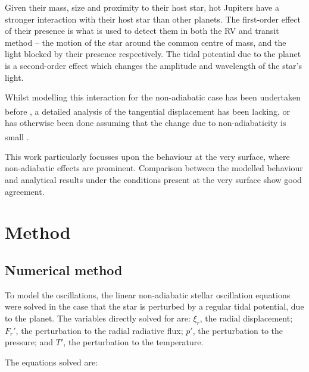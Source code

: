 \documentclass[a0,portrait]{a0poster}
\begin{document}
\begin{multicols}{2}
Given their mass, size and proximity to their host star, hot Jupiters have a stronger interaction with their host star than other planets. The first-order effect of their presence is what is used to detect them in both the RV and transit method -- the motion of the star around the common centre of mass, and the light blocked by their presence respectively. The tidal potential due to the planet is a second-order effect which changes the amplitude and wavelength of the star's light.

Whilst modelling this interaction for the non-adiabatic case has been undertaken before \textsuperscript{\cite{Pfahl2008}}, a detailed analysis of the tangential displacement has been lacking, or has otherwise been done assuming that the change due to non-adiabaticity is small \textsuperscript{\cite{Terquem1998}}.

This work particularly focusses upon the behaviour at the very surface, where non-adiabatic effects are prominent. Comparison between the modelled behaviour and analytical results under the conditions present at the very surface show good agreement.



\color{DarkSlateGray} %

\section*{Method}


\subsection*{Numerical method}

To model the oscillations, the linear non-adiabatic stellar oscillation equations were solved in the case that the star is perturbed by a regular tidal potential, due to the planet. The variables directly solved for are: $\xi_{r}$, the radial displacement; $F_{r}'$, the perturbation to the radial radiative flux; $p'$, the perturbation to the pressure; and $T'$, the perturbation to the temperature.

The equations solved are:


\end{multicols}
\end{document}
